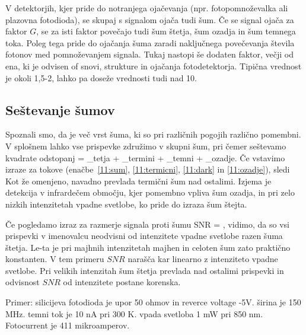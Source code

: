 \begin{remark}
 V detektorjih, kjer pride do notranjega ojačevanja (npr. fotopomnoževalka ali plazovna fotodioda), 
 se skupaj s signalom ojača tudi šum. Če se signal ojača za faktor $G$, se za isti faktor
 povečajo tudi šum štetja, šum ozadja in šum temnega toka. Poleg tega pride do ojačanja šuma
 zaradi naključnega povečevanja števila fotonov med pomnoževanjem signala. Tukaj nastopi
 še dodaten faktor, večji od ena, ki je odvisen of snovi, strukture in ojačanja fotodetektorja. 
 Tipična vrednost je okoli 1,5-2, lahko pa doseže vrednosti tudi nad 10.
\end{remark}

\subsection*{Seštevanje šumov}
Spoznali smo, da je več vrst šuma, ki so pri različnih pogojih različno pomembni. 
V splošnem lahko vse prispevke združimo v skupni šum, pri čemer seštevamo kvadrate
odstopanj
\beq
{} = _{tetja} + _{termini}
+ _{temni} + _{ozadje}.
\eeq
Če vstavimo izraze za tokove (enačbe~\ref{11:sum}, \ref{11:termicni}, \ref{11:dark}
in \ref{11:ozadje}), sledi
Kot že omenjeno, navadno prevlada termični šum nad ostalimi. Izjema je detekcija v
infrardečem območju, kjer pomembno vpliva šum ozadja, in pri zelo nizkih intenzitetah 
vpadne svetlobe, ko pride do izraza šum štejta. 

Če pogledamo izraz za razmerje signala proti šumu
\beq
SNR = ,
\eeq
vidimo, da so vsi prispevki v imenovalcu neodvisni od intenzitete vpadne svetlobe
razen šuma štetja. Le-ta je pri majhnih intenzitetah majhen in celoten šum 
zato praktično konstanten. V tem primeru $SNR$ narašča kar linearno z intenziteto
vpadne svetlobe. Pri velikih intenzitah šum štetja prevlada nad ostalimi prispevki
in odvisnost $SNR$ od intenzitete postane korenska. 



Primer: silicijeva fotodioda je upor 50 ohmov in reverce voltage -5V. širina je 150 MHz. 
temni tok je 10 nA pri 300 K. vpada svetloba 1 mW pri 850 nm. Fotocurrent je 411 mikroamperov. 

